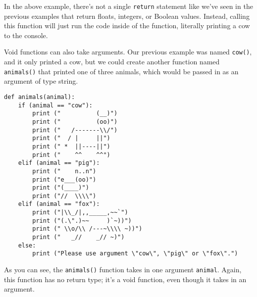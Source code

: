 In the above example, there's not a single \verb|return| statement like we've seen in the previous examples that return floats, integers, or Boolean values. Instead, calling this function will just run the code inside of the function, literally printing a cow to the console.\par
Void functions can also take arguments. Our previous example was named \verb|cow()|, and it only printed a cow, but we could create another function named \verb|animals()| that printed one of three animals, which would be passed in as an argument of type string.\par
\begin{lstlisting}[style=pippython]
def animals(animal):
    if (animal == "cow"):
        print ("          (__)")
        print ("          (oo)")
        print ("   /-------\\/")
        print ("  / |     ||")
        print (" *  ||----||")
        print ("    ^^    ^^")
    elif (animal == "pig"):
        print ("    n..n")
        print ("e___(oo)")
        print ("(____)")
        print ("//  \\\\")
    elif (animal == "fox"):
        print ("|\\_/|,,_____,~~`")
        print ("(.\".)~~     )`~))")
        print (" \\o/\\ /---~\\\\ ~))")
        print ("   _//    _// ~)")
    else:
        print ("Please use argument \"cow\", \"pig\" or \"fox\".")
\end{lstlisting}
As you can see, the \verb|animals()| function takes in one argument \verb|animal|. Again, this function has no return type; it's a void function, even though it takes in an argument.\par
